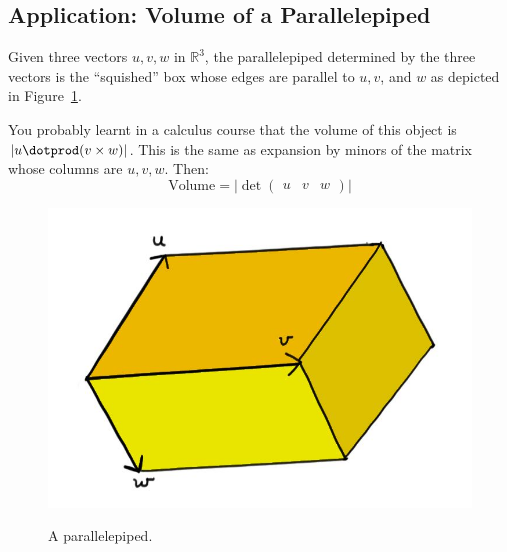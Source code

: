 \subsection{Application: Volume of a Parallelepiped}

Given three vectors $u,v,w$ in $\mathbb{R}^3$, the parallelepiped determined by the three vectors is the ``squished'' box whose edges are parallel to $u, v$, and $w$ as depicted in Figure~\ref{parallelepiped}.

You probably learnt in a  calculus course  that the volume of this object is $|u\dotprod (v\times w)|$.  This is the same as expansion by minors of the matrix whose columns are $u,v,w$.  Then:
\[
\text{Volume}=\big|\det \begin{pmatrix}u & v & w \end{pmatrix} \big|
\] 



\begin{figure}
\begin{center}
\includegraphics[alt={A parallelepiped with edge vectors u, v, and w.},scale=.4]{parallelepiped.jpg}
\caption{A parallelepiped.\label{parallelepiped}}
\end{center}
\end{figure}







